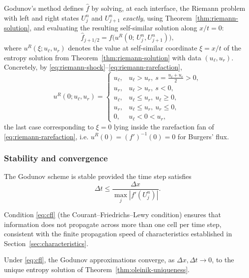 Godunov's method defines $\widehat f$ by solving, at each interface, the
Riemann problem with left and right states $U_j^n$ and $U_{j+1}^n$
\emph{exactly}, using Theorem~\ref{thm:riemann-solution}, and evaluating
the resulting self-similar solution along $x/t=0$:
\begin{equation}
  \label{eq:godunov-flux}
  \widehat f_{j+1/2} = f\big(u^R(0;\, U_j^n, U_{j+1}^n)\big),
\end{equation}
where $u^R(\xi; u_\ell, u_r)$ denotes the value at self-similar
coordinate $\xi=x/t$ of the entropy solution from
Theorem~\ref{thm:riemann-solution} with data $(u_\ell,u_r)$. Concretely,
by \eqref{eq:riemann-shock}--\eqref{eq:riemann-rarefaction},
\begin{equation}
  u^R(0; u_\ell,u_r) =
  \begin{cases}
    u_\ell, & u_\ell>u_r,\ s=\tfrac{u_\ell+u_r}{2}>0, \\
    u_r, & u_\ell>u_r,\ s<0, \\
    u_\ell, & u_\ell\le u_r,\ u_\ell\ge0, \\
    u_r, & u_\ell\le u_r,\ u_r\le0, \\
    0, & u_\ell < 0 < u_r,
  \end{cases}
\end{equation}
the last case corresponding to $\xi=0$ lying inside the rarefaction fan of
\eqref{eq:riemann-rarefaction}, i.e. $u^R(0)=(f')^{-1}(0)=0$ for Burgers'
flux.

\subsubsection{Stability and convergence}
\label{subsubsec:godunov-convergence}

\begin{proposition}
\label{prop:cfl}
The Godunov scheme is stable provided the time step satisfies
\begin{equation}
  \label{eq:cfl}
  \Delta t \le \frac{\Delta x}{\max_j |f'(U_j^n)|}.
\end{equation}
\end{proposition}

Condition \eqref{eq:cfl} (the Courant--Friedrichs--Lewy condition)
ensures that information does not propagate across more than one cell
per time step, consistent with the finite propagation speed of
characteristics established in Section~\ref{sec:characteristics}.

\begin{theorem}
\label{thm:godunov-convergence}
Under \eqref{eq:cfl}, the Godunov approximations converge, as $\Delta x,
\Delta t \to 0$, to the unique entropy solution of
Theorem~\ref{thm:oleinik-uniqueness}.
\end{theorem}

